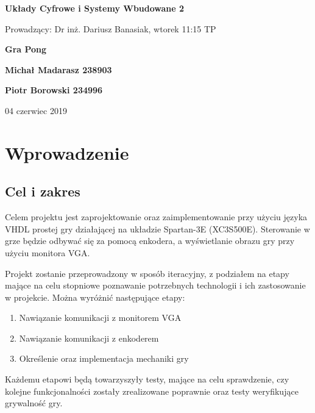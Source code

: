 \documentclass[12pt,a4paper]{article}
\begin{document}
\begin{titlepage}
		
		\centering
		{\huge\bfseries Układy Cyfrowe i Systemy Wbudowane 2\par}
		
		\vspace{0.8cm}
		{\large Prowadzący: Dr inż. Dariusz Banasiak, wtorek 11:15 TP } 
		\vfill	
		{\Large\bfseries Gra Pong \par}
		\vfill
		
		{\large\bfseries Michał Madarasz 238903\par}
		{\large\bfseries Piotr Borowski 234996\par}
		
		\vspace{1cm}
		{04 czerwiec 2019}
		
		\restoregeometry
	\end{titlepage}

	
	
	\tableofcontents	
	
	\setlength{\parindent}{8ex}	
	
	\newpage
	

    \section{Wprowadzenie}
    \subsection{Cel i zakres}
    Celem projektu jest zaprojektowanie oraz zaimplementowanie przy użyciu języka VHDL prostej gry działającej na układzie Spartan-3E (XC3S500E). Sterowanie w grze będzie odbywać się za pomocą enkodera, a wyświetlanie obrazu gry przy użyciu monitora VGA. 
    
Projekt zostanie przeprowadzony w sposób iteracyjny, z podziałem na etapy mające na celu stopniowe poznawanie potrzebnych technologii i ich zastosowanie w projekcie. Można wyróżnić następujące etapy: 
\begin{enumerate}
    \item Nawiązanie komunikacji z monitorem VGA
    \item Nawiązanie komunikacji z enkoderem
    \item Określenie oraz implementacja mechaniki gry
\end{enumerate}
Każdemu etapowi będą towarzyszyły testy, mające na celu sprawdzenie, czy kolejne funkcjonalności zostały zrealizowane poprawnie oraz testy weryfikujące grywalność gry.
\end{document}

